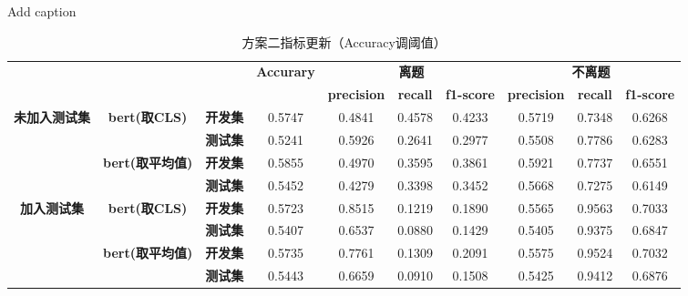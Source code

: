 \documentclass[11pt]{article}
\begin{document}
\begin{CJK}{UTF8}{gkai}
\begin{table}[htbp]\small
  \centering
  \caption{Add caption}
  \begin{tabular}{c|cc|c|ccc|ccc}
    \hline
    \multicolumn{3}{c}{\multirow{2}[0]{*}{\textcolor[rgb]{ 1,  0,  0}{}}} & \multirow{2}[0]{*}{\textbf{Accurary}} & \multicolumn{3}{c}{\textbf{离题}} & \multicolumn{3}{c}{\textbf{不离题}} \\
    \multicolumn{3}{c}{}  &       & \textbf{precision} & \textbf{recall} & \textbf{f1-score} & \textbf{precision} & \textbf{recall} & \textbf{f1-score} \\
    \hline
    \multirow{4}[0]{*}{\textbf{未加入测试集}} & \multirow{2}[0]{*}{\textbf{bert(取CLS)}} & \textbf{开发集} & 0.5747  & 0.4841  & 0.4578  & 0.4233  & 0.5719  & 0.7348  & 0.6268  \\
    &       & \textbf{测试集} & 0.5241  & 0.5926  & 0.2641  & 0.2977  & 0.5508  & 0.7786  & 0.6283  \\
    \cline{2-10}
    & \multirow{2}[0]{*}{\textbf{bert(取平均值)}} & \textbf{开发集} & 0.5855  & 0.4970  & 0.3595  & 0.3861  & 0.5921  & 0.7737  & 0.6551  \\
    &       & \textbf{测试集} & 0.5452  & 0.4279  & 0.3398  & 0.3452  & 0.5668  & 0.7275  & 0.6149  \\
    \hline
    \multirow{4}[0]{*}{\textbf{加入测试集}} & \multirow{2}[0]{*}{\textbf{bert(取CLS)}} & \textbf{开发集} & 0.5723  & 0.8515  & 0.1219  & 0.1890  & 0.5565  & 0.9563  & 0.7033  \\
    &       & \textbf{测试集} & 0.5407  & 0.6537  & 0.0880  & 0.1429  & 0.5405  & 0.9375  & 0.6847  \\
    \cline{2-10}
    & \multirow{2}[0]{*}{\textbf{bert(取平均值)}} & \textbf{开发集} & 0.5735  & 0.7761  & 0.1309  & 0.2091  & 0.5575  & 0.9524  & 0.7032  \\
    &       & \textbf{测试集} & 0.5443  & 0.6659  & 0.0910  & 0.1508  & 0.5425  & 0.9412  & 0.6876  \\
    \hline
    \end{tabular}%
    \caption{方案二指标更新（Accuracy调阈值）}
  \label{tab:addlabel}%
\end{table}%



%
%
%

\end{CJK}
\end{document}

